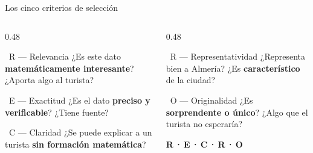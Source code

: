 \documentclass[aspectratio=169, 10pt, spanish]{beamer}
\begin{document}
\begin{frame}{Los cinco criterios de selección}
  \begin{columns}[t]
    \begin{column}{0.48\textwidth}
      \begin{block}{\faCheckDouble\ R — Relevancia}
        ¿Es este dato \textbf{matemáticamente interesante}? ¿Aporta algo al turista?
      \end{block}
      \vspace{0.2cm}
      \begin{block}{\faSearch\ E — Exactitud}
        ¿Es el dato \textbf{preciso y verificable}? ¿Tiene fuente?
      \end{block}
      \vspace{0.2cm}
      \begin{block}{\faComments\ C — Claridad}
        ¿Se puede explicar a un turista \textbf{sin formación matemática}?
      \end{block}
    \end{column}
    \begin{column}{0.48\textwidth}
      \begin{block}{\faMapMarkerAlt\ R — Representatividad}
        ¿Representa bien a Almería? ¿Es \textbf{característico} de la ciudad?
      \end{block}
      \vspace{0.2cm}
      \begin{block}{\faStar\ O — Originalidad}
        ¿Es \textbf{sorprendente o único}? ¿Algo que el turista no esperaría?
      \end{block}
      \vspace{0.3cm}
      \begin{formulabox}[BAnalizar]
        \textbf{R\,·\,E\,·\,C\,·\,R\,·\,O}
      \end{formulabox}
    \end{column}
  \end{columns}
\end{frame}
\end{document}
